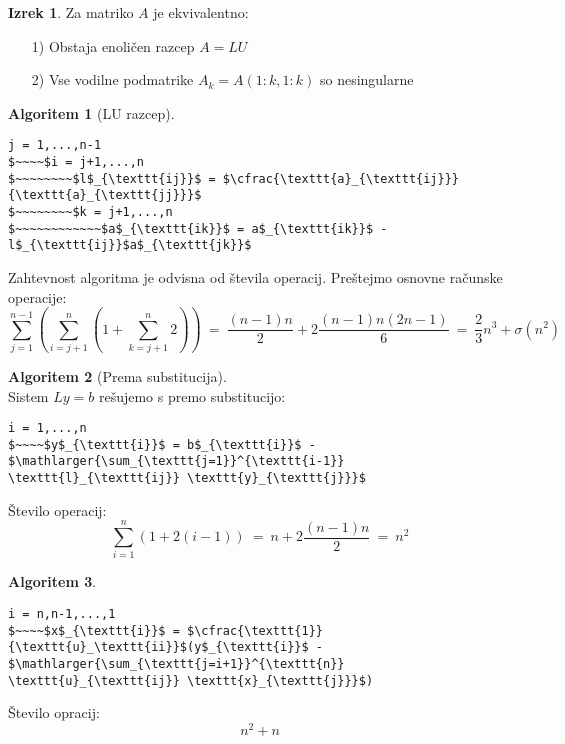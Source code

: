 \documentclass[11pt]{article}
\theoremstyle{definition}
\newtheorem{izrek}{Izrek}
\newtheorem*{algoritem}{Algoritem}
\begin{document}
\begin{izrek}

Za matriko $A$ je ekvivalentno:
\begin{enumerate}
	\item[1)] Obstaja enoličen razcep $A = LU$
	\item[2)] Vse vodilne podmatrike $A_k = A(1:k, 1:k)$ so nesingularne
\end{enumerate}

\end{izrek}
\vspace{0.5cm}

\pagebreak

\begin{algoritem}[LU razcep]
~
\begin{lstlisting}
j = 1,...,n-1
$~~~~$i = j+1,...,n
$~~~~~~~~$l$_{\texttt{ij}}$ = $\cfrac{\texttt{a}_{\texttt{ij}}}{\texttt{a}_{\texttt{jj}}}$
$~~~~~~~~$k = j+1,...,n
$~~~~~~~~~~~~$a$_{\texttt{ik}}$ = a$_{\texttt{ik}}$ - l$_{\texttt{ij}}$a$_{\texttt{jk}}$
\end{lstlisting}
Zahtevnost algoritma je odvisna od števila operacij. Preštejmo osnovne računske operacije:
$$\sum_{j=1}^{n-1} \left( \sum_{i=j+1}^n \left( 1 + \sum_{k=j+1}^n 2 \right) \right) ~=~ \frac{(n-1)n}{2} + 2 \frac{(n-1)n(2n-1)}{6} ~=~ \frac{2}{3}n^3 + \sigma(n^2)$$

\end{algoritem}
\vspace{0.5cm}

\begin{algoritem}[Prema substitucija]
~\\
Sistem $Ly = b$ rešujemo s premo substitucijo:
\begin{lstlisting}
i = 1,...,n
$~~~~$y$_{\texttt{i}}$ = b$_{\texttt{i}}$ - $\mathlarger{\sum_{\texttt{j=1}}^{\texttt{i-1}} \texttt{l}_{\texttt{ij}} \texttt{y}_{\texttt{j}}}$
\end{lstlisting}
Število operacij:
$$\sum_{i=1}^n (1 + 2(i-1)) ~=~ n + 2\frac{(n-1)n}{2} ~=~ n^2$$

\end{algoritem}
\vspace{0.5cm}

\begin{algoritem}
~
\begin{lstlisting}
i = n,n-1,...,1
$~~~~$x$_{\texttt{i}}$ = $\cfrac{\texttt{1}}{\texttt{u}_\texttt{ii}}$(y$_{\texttt{i}}$ - $\mathlarger{\sum_{\texttt{j=i+1}}^{\texttt{n}} \texttt{u}_{\texttt{ij}} \texttt{x}_{\texttt{j}}}$)
\end{lstlisting}
Število opracij:
$$n^2 + n$$

\pagebreak

\end{algoritem}
\vspace{0.5cm}
\end{document}

